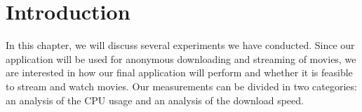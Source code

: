 \section{Introduction}
	In this chapter, we will discuss several experiments we have conducted. Since our application will be used for anonymous downloading and streaming of movies, we are interested in how our final application will perform and whether it is feasible to stream and watch movies. Our measurements can be divided in two categories: an analysis of the CPU usage and an analysis of the download speed.